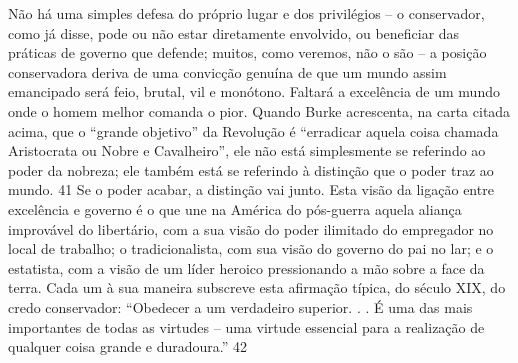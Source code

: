 Não há uma simples defesa do próprio lugar e dos privilégios – o conservador, como já disse, pode ou não estar diretamente envolvido, ou beneficiar das práticas de governo que defende; muitos, como veremos, não o são – a posição conservadora deriva de uma convicção genuína de que um mundo assim emancipado será feio, brutal, vil e monótono. Faltará a excelência de um mundo onde o homem melhor comanda o pior. Quando Burke acrescenta, na carta citada acima, que o “grande objetivo” da Revolução é “erradicar aquela coisa chamada Aristocrata ou Nobre e Cavalheiro”, ele não está simplesmente se referindo ao poder da nobreza; ele também está se referindo à distinção que o poder traz ao mundo.
 {\color{blue} 41}  
Se o poder acabar, a distinção vai junto. Esta visão da ligação entre excelência e governo é o que une na América do pós-guerra aquela aliança improvável do libertário, com a sua visão do poder ilimitado do empregador no local de trabalho; o tradicionalista, com sua visão do governo do pai no lar; e o estatista, com a visão de um líder heroico pressionando a mão sobre a face da terra. Cada um à sua maneira subscreve esta afirmação típica, do século XIX, do credo conservador: “Obedecer a um verdadeiro superior. . . É uma das mais importantes de todas as virtudes – uma virtude essencial para a realização de qualquer coisa grande e duradoura.”
 {\color{blue} 42}  

 
\par
 

